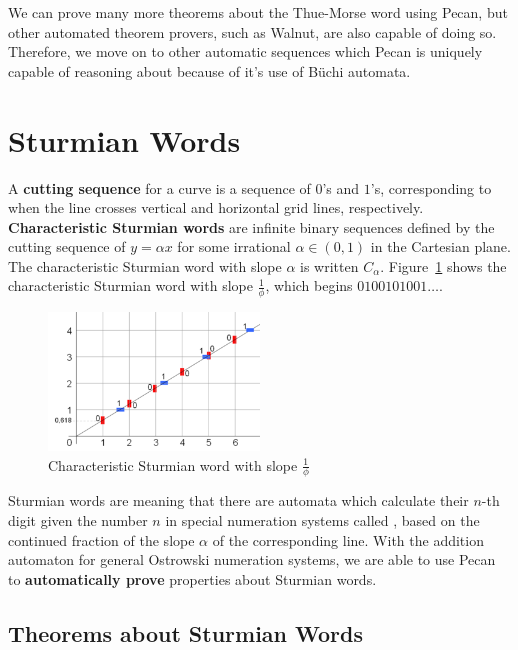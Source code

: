 \documentclass[a4paper,usenames,dvipsnames]{article}
\begin{document}
We can prove many more theorems about the Thue-Morse word using Pecan, but other automated theorem provers, such as Walnut, are also capable of doing so.
Therefore, we move on to other automatic sequences which Pecan is uniquely capable of reasoning about because of it's use of B\"uchi automata.

\section{Sturmian Words}
A \textbf{cutting sequence} for a curve is a sequence of $0$'s and $1$'s, corresponding to when the line crosses vertical and horizontal grid lines, respectively.
\textbf{Characteristic Sturmian words} are infinite binary sequences defined by the cutting sequence of $y = \alpha x$ for some irrational $\alpha \in (0,1)$ in the Cartesian plane.
The characteristic Sturmian word with slope $\alpha$ is written $C_{\alpha}$.
Figure~\ref{fig:fib_word} shows the characteristic Sturmian word with slope $\frac{1}{\phi}$, which begins $0100101001\ldots$.

\begin{figure}
	\centering
    \includegraphics[width=0.5\textwidth]{images/Fibonacci_word_cutting_sequence.png}
    \caption{Characteristic Sturmian word with slope $\frac{1}{\phi}$}
    \label{fig:fib_word}
\end{figure}

Sturmian words are  meaning that there are automata which calculate their $n$-th digit given the number $n$ in special numeration systems called , based on the continued fraction of the slope $\alpha$ of the corresponding line. 
With the addition automaton for general Ostrowski numeration systems, we are able to use Pecan to \textbf{automatically prove} properties about Sturmian words. 

\subsection{Theorems about Sturmian Words}
\end{document}
